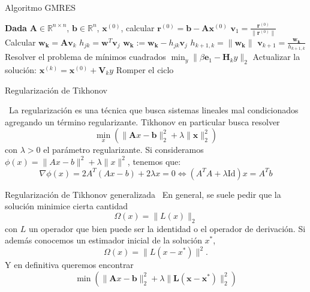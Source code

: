 \documentclass[12pt]{beamer}
\begin{document}
	\begin{frame}
		
		\begin{algorithm}[H]
			\caption{Algoritmo GMRES}
			\begin{algorithmic}[1]
				\State \textbf{Dada} $\mathbf{A} \in \mathbb{R}^{n \times n}$, $\mathbf{b} \in \mathbb{R}^n$, $\mathbf{x}^{(0)}$, calcular $\mathbf{r}^{(0)} = \mathbf{b} - \mathbf{A} \mathbf{x}^{(0)}$
				\State $\mathbf{v}_1 = \frac{\mathbf{r}^{(0)}}{\|\mathbf{r}^{(0)}\|}$
				\State Calcular $\mathbf{w_k} = \mathbf{A} \mathbf{v}_k$
				\State $h_{jk} = \mathbf{w}^T \mathbf{v}_j$
				\State $\mathbf{w_k} := \mathbf{w_k} - h_{jk} \mathbf{v}_j$
				\EndFor
				\State $h_{k+1,k} = \|\mathbf{w_k}\|$
				\State $\mathbf{v}_{k+1} = \frac{\mathbf{w_k}}{h_{k+1,k}}$
				\EndIf
				\EndFor
				\State Resolver el problema de mínimos cuadrados $\min_y \|\beta \mathbf{e}_1 - \mathbf{H}_k y\|_2$
				\State Actualizar la solución: $\mathbf{x}^{(k)} = \mathbf{x}^{(0)} + \mathbf{V}_k y$
				\State Romper el ciclo
				\EndIf
			\end{algorithmic}
		\end{algorithm}
		
	\end{frame}
	
	\begin{frame}{Regularización de Tikhonov}
		
		\ La regularización es una técnica que busca sistemas lineales mal condicionados agregando un término regularizante. Tikhonov en particular busca resolver $$\min_{x} \left( \| \mathbf{A}x - \mathbf{b} \|_2^2 + \lambda \| \mathbf{x} \|_2^2 \right)$$ con $\lambda > 0$ el parámetro regularizante. Si consideramos $\phi(x) = \|Ax - b\|^2 + \lambda \|x\|^2$, tenemos que: \[
		\nabla \phi(x) = 2A^T(Ax - b) + 2\lambda x = 0 \iff 
		\boxed{(A^TA + \lambda \mathrm{Id})x = A^Tb}
		\]
		
	\end{frame}
	
	\begin{frame}{Regularización de Tikhonov generalizada}
		\ En general, se suele pedir que la solución minimice cierta cantidad 
		\[
		\Omega(x) = \| L(x) \|_2
		\] con $L$ un operador que bien puede ser la identidad o el operador de derivación. Si además conocemos un estimador inicial de la solución $x^*$, $$\Omega(x) = \| L(x - x^*) \|^2.$$ Y en definitiva queremos encontrar $$\min \left( \| \mathbf{A}x - \mathbf{b} \|_2^2 + \lambda \| \mathbf{L(x - x^*)} \|_2^2 \right)$$
		
		
	\end{frame}
	
\end{document}
